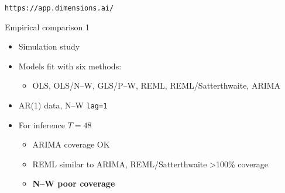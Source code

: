 \documentclass[aspectratio=169,12pt]{beamer} %
\begin{document}
\begin{frame}[plain,b]
\begin{flushright}\texttt{https://app.dimensions.ai/}\end{flushright}
\end{frame}
\usebackgroundtemplate{}


\begin{frame}{Empirical comparison 1}
	\begin{itemize}
		\item Simulation study
		\citep{turner_evaluation_2020}
		\item Models fit with six methods:
		\begin{itemize}
			\item OLS, OLS/N--W, GLS/P--W, REML, REML/Satterthwaite, ARIMA
		\end{itemize}
		\item AR(1) data, N--W \texttt{lag=1}
		\item For inference \( T=48 \)
		\begin{itemize}
			\item ARIMA coverage OK
			\item REML similar to ARIMA, REML/Satterthwaite >100\% coverage
			\item \textbf{N--W poor coverage}
		\end{itemize}
	\end{itemize}
\end{frame}
\end{document}
